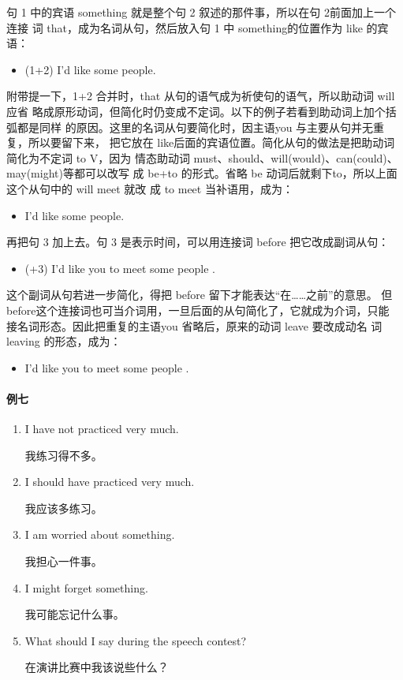 句 1 中的宾语 something 就是整个句 2 叙述的那件事，所以在句 2前面加上一个连接
词 that，成为名词从句，然后放入句 1 中 something的位置作为 like 的宾语：
\begin{itemize}
\item (1+2) I'd like  some people.
\end{itemize}
附带提一下，1+2 合并时，that 从句的语气成为祈使句的语气，所以助动词 will应省
略成原形动词，但简化时仍变成不定词。以下的例子若看到助动词上加个括弧都是同样
的原因。这里的名词从句要简化时，因主语you 与主要从句并无重复，所以要留下来，
把它放在 like后面的宾语位置。简化从句的做法是把助动词简化为不定词 to V，因为
情态助动词 must、should、will(would)、can(could)、 may(might)等都可以改写
成 be+to 的形式。省略 be 动词后就剩下to，所以上面这个从句中的 will meet 就改
成 to meet 当补语用，成为：
\begin{itemize}
\item I'd like  some people.
\end{itemize}
再把句 3 加上去。句 3 是表示时间，可以用连接词 before 把它改成副词从句：
\begin{itemize}
\item (+3) I'd like you to meet some people .
\end{itemize}
这个副词从句若进一步简化，得把 before 留下才能表达“在……之前”的意思。
但 before这个连接词也可当介词用，一旦后面的从句简化了，它就成为介词，只能
接名词形态。因此把重复的主语you 省略后，原来的动词 leave 要改成动名
词 leaving 的形态，成为：
\begin{itemize}
\item I'd like you to meet some people .
\end{itemize}

\paragraph{例七}

\begin{enumerate}
\item I have not practiced very much.

  我练习得不多。
\item I should have practiced very much.

  我应该多练习。
\item I am worried about something.

  我担心一件事。
\item I might forget something.

  我可能忘记什么事。
\item What should I say during the speech contest?

  在演讲比赛中我该说些什么？
\end{enumerate}

